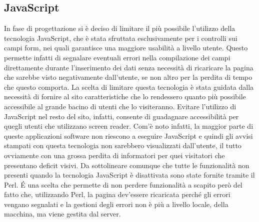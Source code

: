 \subsection{JavaScript}
In fase di progettazione si \`e deciso di limitare il pi\`u possibile l'utilizzo della tecnologia JavaScript, che \`e stata sfruttata esclusivamente per i controlli sui campi form, nei quali garantisce una maggiore usabilit\`a a livello utente. Questo permette infatti di segnalare eventuali errori nella compilazione dei campi direttamente durante l'inserimento dei dati senza necessit\`a di ricaricare la pagina che sarebbe visto negativamente dall'utente, se non altro per la perdita di tempo che questo comporta. La scelta di limitare questa tecnologia \`e stata guidata dalla necessit\`a di fornire al sito caratteristiche che lo rendessero quanto pi\`u possibile accessibile al grande bacino di utenti che lo visiteranno. Evitare l'utilizzo di JavaScript nel resto del sito, infatti, consente di guadagnare accessibilit\`a per quegli utenti che utilizzano screen reader. Com'\`e noto infatti, la maggior parte di queste applicazioni software non riescono a eseguire JavaScript e quindi gli avvisi stampati con questa tecnologia non sarebbero visualizzati dall'utente, il tutto ovviamente con una grossa perdita di informatori per quei visitatori che presentano deficit visivi.
Da sottolineare comunque che tutte le funzionalit\`a non presenti quando la tecnologia JavaScript \`e disattivata sono state fornite tramite il Perl. \'E una scelta che permette di non perdere funzionalit\`a a scapito per\`o del fatto che, utilizzando Perl, la pagina dev'essere ricaricata perch\'e gli errori vengano segnalati e la gestioni degli errori non \`e pi\`u a livello locale, della macchina, ma viene gestita dal server.
